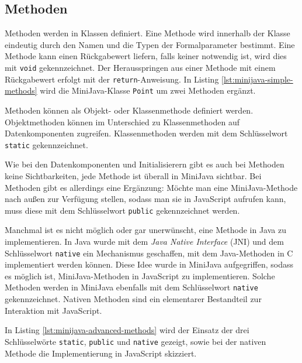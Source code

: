 

\subsection{Methoden}
\label{subsec:MiniJava-Methoden}

Methoden werden in Klassen definiert. Eine Methode wird innerhalb der Klasse eindeutig durch den Namen und die Typen der Formalparameter bestimmt. Eine Methode kann einen Rückgabewert liefern, falls keiner notwendig ist, wird dies mit \lstinline{void} gekennzeichnet. Der Herausspringen aus einer Methode mit einem Rückgabewert erfolgt mit der \lstinline{return}-Anweisung. In Listing \ref{lst:minijava-simple-methods} wird die MiniJava-Klasse \lstinline{Point} um zwei Methoden ergänzt.



Methoden können als Objekt- oder Klassenmethode definiert werden. Objektmethoden können im Unterschied zu Klassenmethoden auf Datenkomponenten zugreifen. Klassenmethoden werden mit dem Schlüsselwort \lstinline{static} gekennzeichnet.

Wie bei den Datenkomponenten und Initialisierern gibt es auch bei Methoden keine Sichtbarkeiten, jede Methode ist überall in MiniJava sichtbar. Bei Methoden gibt es allerdings eine Ergänzung: Möchte man eine MiniJava-Methode nach außen zur Verfügung stellen, sodass man sie in JavaScript aufrufen kann, muss diese mit dem Schlüsselwort \lstinline{public} gekennzeichnet werden.

Manchmal ist es nicht möglich oder gar unerwünscht, eine Methode in Java zu implementieren. In Java wurde mit dem \emph{Java Native Interface} (JNI) \cite{JNI8} und dem Schlüsselwort \lstinline{native} ein Mechanismus geschaffen, mit dem Java-Methoden in C implementiert werden können. Diese Idee wurde in MiniJava aufgegriffen, sodass es möglich ist, MiniJava-Methoden in JavaScript zu implementieren. Solche Methoden werden in MiniJava ebenfalls mit dem Schlüsselwort \lstinline{native} gekennzeichnet. Nativen Methoden sind ein elementarer Bestandteil zur Interaktion mit JavaScript.

In Listing \ref{lst:minijava-advanced-methods} wird der Einsatz der drei Schlüsselwörte \lstinline{static}, \lstinline{public} und \lstinline{native} gezeigt, sowie bei der nativen Methode die Implementierung in JavaScript skizziert.


